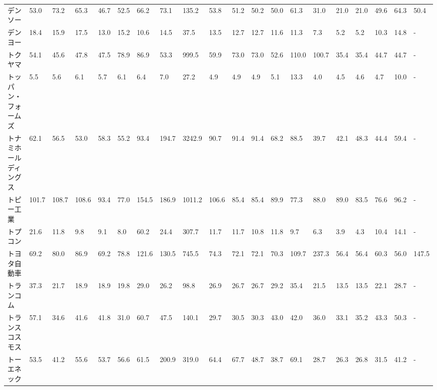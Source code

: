 \begin{tabular}{llllllllllllllllllll}
デンソー            &   53.0 &   73.2 &      65.3 &      46.7 &       52.5 &    66.2 &    73.1 &    135.2 &    53.8 &    51.2 &   50.2 &   50.0 &    61.3 &    31.0 &    21.0 &   21.0 &   49.6 &    64.3 &   50.4 \\
デンヨー            &   18.4 &   15.9 &      17.5 &      13.0 &       15.2 &    10.6 &    14.5 &     37.5 &    13.5 &    12.7 &   12.7 &   11.6 &    11.3 &     7.3 &     5.2 &    5.2 &   10.3 &    14.8 &      - \\
トクヤマ            &   54.1 &   45.6 &      47.8 &      47.5 &       78.9 &    86.9 &    53.3 &    999.5 &    59.9 &    73.0 &   73.0 &   52.6 &   110.0 &   100.7 &    35.4 &   35.4 &   44.7 &    44.7 &      - \\
トッパン・フォームズ      &    5.5 &    5.6 &       6.1 &       5.7 &        6.1 &     6.4 &     7.0 &     27.2 &     4.9 &     4.9 &    4.9 &    5.1 &    13.3 &     4.0 &     4.5 &    4.6 &    4.7 &    10.0 &      - \\
トナミホールディングス     &   62.1 &   56.5 &      53.0 &      58.3 &       55.2 &    93.4 &   194.7 &   3242.9 &    90.7 &    91.4 &   91.4 &   68.2 &    88.5 &    39.7 &    42.1 &   48.3 &   44.4 &    59.4 &      - \\
トピー工業           &  101.7 &  108.7 &     108.6 &      93.4 &       77.0 &   154.5 &   186.9 &   1011.2 &   106.6 &    85.4 &   85.4 &   89.9 &    77.3 &    88.0 &    89.0 &   83.5 &   76.6 &    96.2 &      - \\
トプコン            &   21.6 &   11.8 &       9.8 &       9.1 &        8.0 &    60.2 &    24.4 &    307.7 &    11.7 &    11.7 &   10.8 &   11.8 &     9.7 &     6.3 &     3.9 &    4.3 &   10.4 &    14.1 &      - \\
トヨタ自動車          &   69.2 &   80.0 &      86.9 &      69.2 &       78.8 &   121.6 &   130.5 &    745.5 &    74.3 &    72.1 &   72.1 &   70.3 &   109.7 &   237.3 &    56.4 &   56.4 &   60.3 &    56.0 &  147.5 \\
トランコム           &   37.3 &   21.7 &      18.9 &      18.9 &       19.8 &    29.0 &    26.2 &     98.8 &    26.9 &    26.7 &   26.7 &   29.2 &    35.4 &    21.5 &    13.5 &   13.5 &   22.1 &    28.7 &      - \\
トランスコスモス        &   57.1 &   34.6 &      41.6 &      41.8 &       31.0 &    60.7 &    47.5 &    140.1 &    29.7 &    30.5 &   30.3 &   43.0 &    42.0 &    36.0 &    33.1 &   35.2 &   43.3 &    50.3 &      - \\
トーエネック          &   53.5 &   41.2 &      55.6 &      53.7 &       56.6 &    61.5 &   200.9 &    319.0 &    64.4 &    67.7 &   48.7 &   38.7 &    69.1 &    28.7 &    26.3 &   26.8 &   31.5 &    41.2 &      - \\

\end{tabular}
